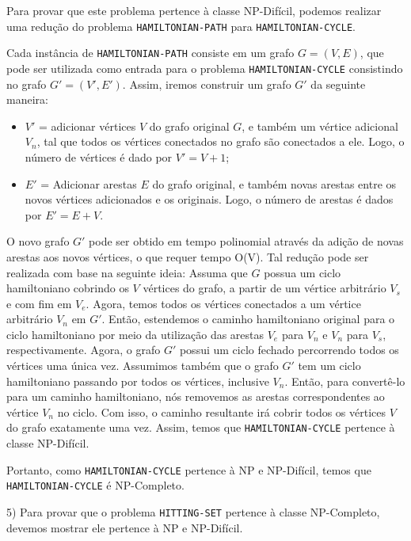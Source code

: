 \documentclass[]{article}
\begin{document}
Para provar que este problema pertence à classe NP-Difícil, podemos realizar uma redução do problema \texttt{HAMILTONIAN-PATH} para \texttt{HAMILTONIAN-CYCLE}.

Cada instância de \texttt{HAMILTONIAN-PATH} consiste em um grafo $G=(V, E)$, que pode ser utilizada como entrada para o problema \texttt{HAMILTONIAN-CYCLE} consistindo no grafo $G'=(V', E')$. Assim, iremos construir um grafo $G'$ da seguinte maneira: 
\begin{itemize}
    \item $V'$ = adicionar vértices $V$ do grafo original $G$, e também um vértice adicional $V_n$, tal que todos os vértices conectados no grafo são conectados a ele. Logo, o número de vértices é dado por $V'=V+1$;
    
    \item $E'$ = Adicionar arestas $E$ do grafo original, e também novas arestas entre os novos vértices adicionados e os originais. Logo, o número de arestas é dados por $E'=E+V$.
\end{itemize}

O novo grafo $G'$ pode ser obtido em tempo polinomial através da adição de novas arestas aos novos vértices, o que requer tempo O(V). Tal redução pode ser realizada com base na seguinte ideia: Assuma que $G$ possua um ciclo hamiltoniano cobrindo os $V$ vértices do grafo, a partir de um vértice arbitrário $V_s$ e com fim em $V_e$. Agora, temos todos os vértices conectados a um vértice arbitrário $V_n$ em $G'$. Então, estendemos o caminho hamiltoniano original para o ciclo hamiltoniano por meio da utilização das arestas $V_e$ para $V_n$ e $V_n$ para $V_s$, respectivamente. Agora, o grafo $G'$ possui um ciclo fechado percorrendo todos os vértices uma única vez. Assumimos também que o grafo $G'$ tem um ciclo hamiltoniano passando por todos os vértices, inclusive $V_n$. Então, para convertê-lo para um caminho hamiltoniano, nós removemos as arestas correspondentes ao vértice $V_n$ no ciclo. Com isso, o caminho resultante irá cobrir todos os vértices $V$ do grafo exatamente uma vez. Assim, temos que \texttt{HAMILTONIAN-CYCLE} pertence à classe NP-Difícil.

Portanto, como \texttt{HAMILTONIAN-CYCLE} pertence à NP e NP-Difícil, temos que \texttt{HAMILTONIAN-CYCLE} é NP-Completo.

\newpage

5) Para provar que o problema \texttt{HITTING-SET} pertence à classe NP-Completo, devemos mostrar ele pertence à NP e NP-Difícil.
\end{document}
